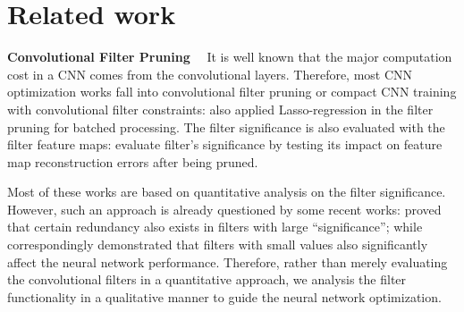 \documentclass{article} %
\begin{document}
\section{Related work}\label{sec:prelim}\textbf{Convolutional Filter Pruning}
~~It is well known that the major computation cost in a CNN comes from the convolutional layers.
	Therefore, most CNN optimization works fall into convolutional filter pruning or compact CNN training with convolutional filter constraints:
	\cite{he2017channel} also applied Lasso-regression in the filter pruning for batched processing.
The filter significance is also evaluated with the filter feature maps:
	\cite{lLuo2017Thinet} evaluate filter's significance by testing its impact on feature map reconstruction errors after being pruned.

Most of these works are based on quantitative analysis on the filter significance.
	However, such an approach is already questioned by some recent works: \cite{huang2018learning} proved that certain redundancy also exists in filters with large ``significance'';
	while \cite{ye2018rethinking} correspondingly demonstrated that filters with small values also significantly affect the neural network performance.
Therefore, rather than merely evaluating the convolutional filters in a quantitative approach, we analysis the filter functionality in a qualitative manner to guide the neural network optimization.
\end{document}

